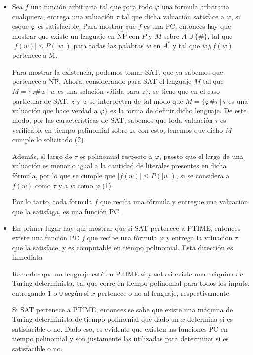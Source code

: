 \documentclass[letterpaper,10pt]{article}
\begin{document}
\begin{itemize}
    \item Sea $f$ una función arbitraria tal que para todo $\varphi$ una formula arbitraria cualquiera, entrega una valuación $\tau$ tal que dicha valuación satisface a $\varphi$, si esque $\varphi$ es satisfacible. Para mostrar que $f$ es una PC, entonces hay que mostrar que existe un lenguaje en $\hat{\text{NP}}$ con $P$ y $M$ sobre $A \cup \{\#\}$, tal que $|f(w)| \leq P(|w|)$ para todas las palabras $w$ en $A^*$ y tal que $w\#f(w)$ pertenece a M.

    Para mostrar la existencia, podemos tomar SAT, que ya sabemos que pertenece a $\hat{\text{NP}}$. Ahora, considerando para SAT el lenguaje $M$ tal que $M=\{z\#w \ |\ w$ es una solución válida para $z\}$, se tiene que en el caso particular de SAT, $z$ y $w$ se interpretan de tal modo que $M = \{\varphi\#\tau \ |\ \tau$ es una valuación que hace verdad a $\varphi\}$ es la forma de definir dicho lenguaje. De este modo, por las características de SAT, sabemos que toda valuación $\tau$ es verificable en tiempo polinomial sobre $\varphi$, con esto, tenemos que dicho $M$ cumple lo solicitado (2).

    Además, el largo de $\tau$ es polinomial respecto a $\varphi$, puesto que el largo de una valuación es menor o igual a la cantidad de literales presentes en dicha fórmula, por lo que se cumple que $|f(w)| \leq P(|w|)$, si se considera a $f(w)$ como $\tau$ y a $w$ como $\varphi$ (1).

    Por lo tanto, toda formula $f$ que reciba una fórmula y entregue una valuación que la satisfaga, es una función PC.

    \item En primer lugar hay que mostrar que si SAT pertenece a PTIME, entonces existe una función PC $f$ que recibe una fórmula $\varphi$ y entrega la valuación $\tau$ que la satisface, y es computable en tiempo polinomial. Esta dirección es inmediata.

    Recordar que un lenguaje está en PTIME si y solo si existe una máquina de Turing determinista, tal que corre en tiempo polinomial para todos los inputs, entregando 1 o 0 según si $x$ pertenece o no al lenguaje, respectivamente.

    Si SAT pertenece a PTIME, entonces se sabe que existe una máquina de Turing determinista de tiempo polinomial que dado un $x$ determina si es satisfacible o no. Dado eso, es evidente que existen las funciones PC en tiempo polinomial y son justamente las utilizadas para determinar si es satisfacible o no.


\end{itemize}
\end{document}

